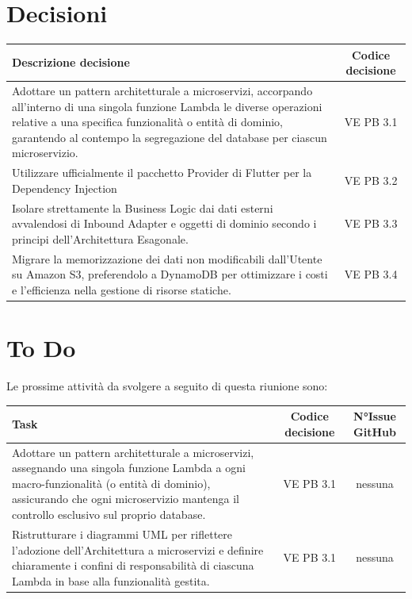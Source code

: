 \documentclass[a4paper,12pt]{article}
\newcommand{\ignoreglossary}{}
\begin{document}
\section{Decisioni}
\begin{center}
\small
\renewcommand{\arraystretch}{1.2} 
\begin{tabular}{|p{}|c|}
\hline
\rowcolor{gray!60} 
\textbf{Descrizione decisione} & \textbf{Codice decisione} \\
\hline
Adottare un pattern architetturale a microservizi, accorpando all'interno di una singola funzione Lambda le diverse operazioni relative a una specifica funzionalità o entità di dominio, garantendo al contempo la segregazione del database per ciascun microservizio. & VE \ignoreglossary{PB} 3.1 \\
\hline
Utilizzare ufficialmente il pacchetto Provider di Flutter per la Dependency Injection &  VE \ignoreglossary{PB} 3.2 \\
\hline
Isolare strettamente la Business Logic dai dati esterni avvalendosi di Inbound Adapter e oggetti di dominio secondo i principi dell'Architettura Esagonale. &  VE \ignoreglossary{PB} 3.3\\
\hline
Migrare la memorizzazione dei dati non modificabili dall'Utente su Amazon S3, preferendolo a DynamoDB per ottimizzare i costi e l'efficienza nella gestione di risorse statiche. &  VE \ignoreglossary{PB} 3.4\\
\hline
\end{tabular}
\end{center}

\section{To Do}
Le prossime attività da svolgere a seguito di questa riunione sono:
\begin{center}
\small
\renewcommand{\arraystretch}{1.2} 
\begin{tabularx}{\textwidth}{|X|c|c|}
\hline
\rowcolor{gray!60} 
\textbf{Task} & \textbf{Codice decisione} & \textbf{N°Issue GitHub} \\
\hline
Adottare un pattern architetturale a microservizi, assegnando una singola funzione Lambda a ogni macro-funzionalità (o entità di dominio), assicurando che ogni microservizio mantenga il controllo esclusivo sul proprio database. & VE \ignoreglossary{PB} 3.1 & nessuna \\
\hline
Ristrutturare i diagrammi UML per riflettere l'adozione dell'Architettura a microservizi e definire chiaramente i confini di responsabilità di ciascuna Lambda in base alla funzionalità gestita. & VE \ignoreglossary{PB} 3.1 & nessuna \\
\hline
\end{tabularx}
\end{center}
\end{document}
